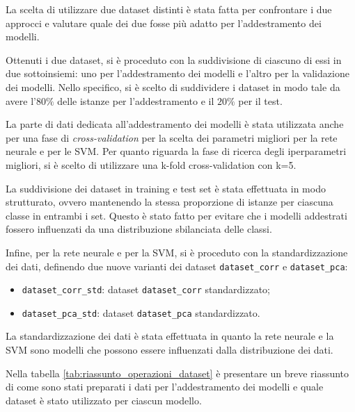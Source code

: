 La scelta di utilizzare due dataset distinti è stata fatta per confrontare
i due approcci e valutare quale dei due fosse più adatto per l'addestramento
dei modelli.

Ottenuti i due dataset, si è proceduto con la suddivisione di ciascuno di essi
in due sottoinsiemi: uno per l'addestramento dei modelli e l'altro per la
validazione dei modelli. Nello specifico, si è scelto di suddividere i dataset
in modo tale da avere l'$80\%$ delle istanze per l'addestramento e il $20\%$ per
il test.

La parte di dati dedicata all'addestramento dei modelli è stata utilizzata anche
per una fase di \textit{cross-validation} per la scelta dei parametri migliori
per la rete neurale e per le SVM. Per quanto riguarda la fase di ricerca degli
iperparametri migliori, si è scelto di utilizzare una k-fold cross-validation
con k=5.

La suddivisione dei dataset in training e test set è stata effettuata in modo
strutturato, ovvero mantenendo la stessa proporzione di istanze per ciascuna
classe in entrambi i set. Questo è stato fatto per evitare che i modelli
addestrati fossero influenzati da una distribuzione sbilanciata delle classi.

Infine, per la rete neurale e per la SVM, si è proceduto con la standardizzazione
dei dati, definendo due nuove varianti dei dataset \texttt{dataset\_corr} e
\texttt{dataset\_pca}:
\begin{itemize}
      \item \texttt{dataset\_corr\_std}: dataset \texttt{dataset\_corr} standardizzato;
      \item \texttt{dataset\_pca\_std}: dataset \texttt{dataset\_pca} standardizzato.
\end{itemize}

La standardizzazione dei dati è stata effettuata in quanto la rete neurale e
la SVM sono modelli che possono essere influenzati dalla distribuzione dei dati.

Nella tabella \ref{tab:riassunto_operazioni_dataset} è presentare un breve
riassunto di come sono stati preparati i dati per l'addestramento dei modelli e
quale dataset è stato utilizzato per ciascun modello.

